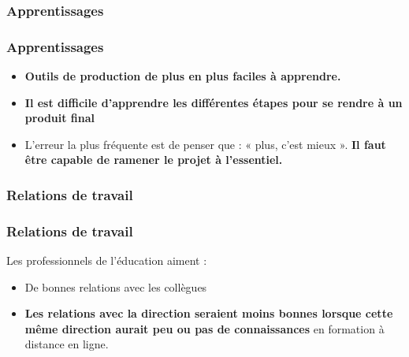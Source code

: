 					\subsubsection{Apprentissages} 
						\begin{frame}[allowframebreaks]
						\frametitle{Apprentissages}
                        			 
                        			\begin{itemize}
                        			\item \textbf{Outils de production de plus en plus faciles à apprendre. }
                        			\item \textbf{Il est difficile d'apprendre les différentes étapes pour se rendre à un produit final}
                        			\item L’erreur la plus fréquente est de penser que : « plus, c’est mieux ». \textbf{Il faut être capable de ramener le projet à l’essentiel.}

                        				
						\end{itemize}
						\end{frame}	
						
					\subsubsection{Relations de travail} 
						\begin{frame}[allowframebreaks]
						\frametitle{Relations de travail}
                        			Les professionnels de l'éducation aiment : 
                        			\begin{itemize}
                        			\item De bonnes relations avec les collègues
                        			\item \textbf{Les relations avec la direction seraient moins bonnes lorsque cette même direction aurait peu ou pas de connaissances} en formation à distance en ligne.

                        				
						\end{itemize}
						\end{frame}	
						
